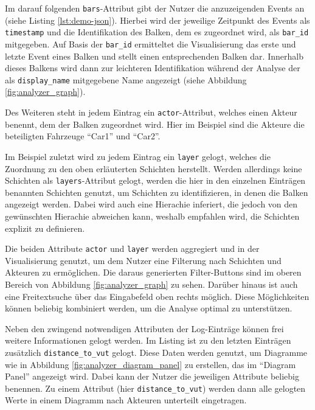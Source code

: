 

Im darauf folgenden \texttt{bars}-Attribut gibt der Nutzer die anzuzeigenden Events an (siehe Listing \ref{lst:demo-json}). Hierbei wird der jeweilige Zeitpunkt des Events als \texttt{timestamp} und die Identifikation des Balken, dem es zugeordnet wird, als \texttt{bar\_id} mitgegeben. Auf Basis der \texttt{bar\_id} ermitteltet die Visualisierung das erste und letzte Event eines Balken und stellt einen entsprechenden Balken dar. Innerhalb dieses Balkens wird dann zur leichteren Identifikation während der Analyse der als \texttt{display\_name} mitgegebene Name angezeigt (siehe Abbildung \ref{fig:analyzer_graph}).

Des Weiteren steht in jedem Eintrag ein \texttt{actor}-Attribut, welches einen Akteur benennt, dem der Balken zugeordnet wird. Hier im Beispiel sind die Akteure die beteiligten Fahrzeuge \enquote{Car1} und \enquote{Car2}.

Im Beispiel zuletzt wird zu jedem Eintrag ein \texttt{layer} gelogt, welches die Zuordnung zu den oben erläuterten Schichten herstellt. Werden allerdings keine Schichten als \texttt{layers}-Attribut gelogt, werden die hier in den einzelnen Einträgen benannten Schichten genutzt, um Schichten zu identifizieren, in denen die Balken angezeigt werden. Dabei wird auch eine Hierachie inferiert, die jedoch von den gewünschten Hierachie abweichen kann, weshalb empfahlen wird, die Schichten explizit zu definieren.

Die beiden Attribute \texttt{actor} und \texttt{layer} werden aggregiert und in der Visualisierung genutzt, um dem Nutzer eine Filterung nach Schichten und Akteuren zu ermöglichen. Die daraus generierten Filter-Buttons sind im oberen Bereich von Abbildung \ref{fig:analyzer_graph} zu sehen.
Darüber hinaus ist auch eine Freitextsuche über das Eingabefeld oben rechts möglich. Diese Möglichkeiten können beliebig kombiniert werden, um die Analyse optimal zu unterstützen.

Neben den zwingend notwendigen Attributen der Log-Einträge können frei weitere Informationen gelogt werden. Im Listing
ist zu den letzten Einträgen zusätzlich \texttt{distance\_to\_vut} gelogt. Diese Daten werden genutzt, um Diagramme wie in Abbildung \ref{fig:analyzer_diagram_panel} zu erstellen, das im \enquote{Diagram Panel} angezeigt wird. Dabei kann der Nutzer die jeweiligen Attribute beliebig benennen. Zu einem Attribut (hier \texttt{distance\_to\_vut}) werden dann alle gelogten Werte in einem Diagramm nach Akteuren unterteilt eingetragen.

